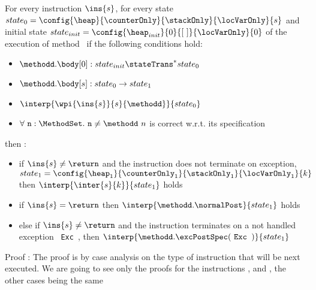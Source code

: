 \begin{lemma0} \label{lemma0}
For every instruction $\ins{s}$, for every state $state_0 =\config{\heap }{\counterOnly }{\stackOnly }{\locVarOnly }{s } $ and
initial state $state_{init} =\config{\heap_{init}  }{ 0 }{\lbrack \ \rbrack }{\locVarOnly }{ 0 } $ 
   of the execution of method \methodd \  if the following conditions hold: 
 \begin{itemize}
         \item $ \methodd.\body[0] : state_{init} \stateTrans^{*} state_0$
         \item $ \methodd.\body[s] : state_0 \rightarrow state_1$
         \item $ \interp{\wpi{\ins{s}}{s}{\methodd}}{state_0} $
         \item    $ \forall \mbox{ \rm \texttt{n}} : \MethodSet . \mbox{ \rm \texttt{n}}   \neq \methodd \ n$ is correct w.r.t. its specification
 \end{itemize}
  
  then : 
 \begin{itemize}
         \item if  $ \ins{s} \neq \return $ and the instruction does not terminate on exception,
	      $ state_1 = \config{\heap_1 }{\counterOnly_1 }{ \stackOnly_1}{\locVarOnly_1 }{ k }  $
	       then  $ \interp{\inter{s}{k}}{state_1}  $   holds 
        \item if  $ \ins{s} = \return $ then  $ \interp{\methodd.\normalPost}{state_1}  $   holds
	\item else if $ \ins{s} \neq \return $ and the instruction terminates on a not handled exception \mbox{ \rm\texttt{Exc }}, then
	      $ \interp{\methodd.\excPostSpec( \mbox{ \rm\texttt{Exc }} )}{state_1}  $ 
	
  \end{itemize} 
\end{lemma0}
Proof :
The proof is by case analysis on the type of instruction that will be next executed. 
We are going to see only the proofs for the instructions \return , \load and \invoke, the other cases being the same
